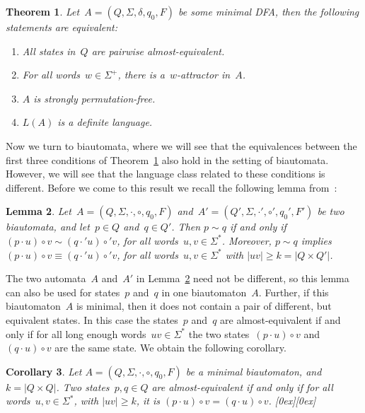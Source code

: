 \documentclass[submission]{eptcs}
\newcommand{\dfa}{\textrm{DFA}}
\newcommand{\abs}[1]{\left\lvert{#1}\right\rvert}
\newcommand*{\qed}{\raisebox{0.5ex}[0ex][0ex]{\framebox[1ex][l]{}}}
\newtheorem{theorem}{Theorem}
\newtheorem{lemma}[theorem]{Lemma}
\newtheorem{corollary}[theorem]{Corollary}
\begin{document}
\begin{theorem}\label{thm:dfa-characterization-almost-definite}
  Let~$A=(Q,\Sigma,\delta,q_0,F)$ be some \emph{minimal} \dfa, then the
  following statements are equivalent:
  \begin{enumerate}
  \item All states in~$Q$ are pairwise
    almost-equivalent.  \label{item:charact-almost}
  \item For all words~$w\in\Sigma^+$, there is a~$w$-attractor
    in~$A$.  \label{item:charact-attractor}
  \item $A$ is strongly
    permutation-free.  \label{item:charact-permutation}
  \item $L(A)$ is a definite language.\label{item:charact-definite}
  \end{enumerate}
\end{theorem}

Now we turn to biautomata, where we will see that the equivalences
between the first three conditions of
Theorem~\ref{thm:dfa-characterization-almost-definite} also hold in
the setting of biautomata.  However, we will see that the language
class related to these conditions is different.
Before we come to this result we recall the following lemma
from~\cite{HoJa14}:

\begin{lemma}\label{lem:dbia-almost-equiv-right-invariant}
  Let~$A=(Q,\Sigma,\cdot,\circ,q_0,F)$
  and~$A'=(Q',\Sigma,\cdot',\circ',q_0',F')$ be two biautomata, and
  let~$p\in Q$ and~$q\in Q'$.  Then $p\sim q$ if and only if $(p\cdot
  u)\circ v\sim (q\cdot' u)\circ' v$, for all words~$u,v\in\Sigma^*$.
  Moreover, $p\sim q$ implies~$(p\cdot u)\circ v \equiv (q\cdot'
  u)\circ' v$, for all words~$u,v\in\Sigma^*$ with $\abs{uv}\geq
  k=\abs{Q\times Q'}$.
\end{lemma}

The two automata~$A$ and~$A'$ in
Lemma~\ref{lem:dbia-almost-equiv-right-invariant} need not be
different, so this lemma can also be used for states~$p$ and~$q$ in
one biautomaton~$A$.  Further, if this biautomaton~$A$ is minimal,
then it does not contain a pair of different, but equivalent states.
In this case the states~$p$ and~$q$ are almost-equivalent if and only
if for all long enough words~$uv\in\Sigma^*$ the two states~$(p\cdot
u)\circ v$ and~$(q\cdot u)\circ v$ are the same state.  We obtain the
following corollary.

\begin{corollary}\label{cor:p-q-almost-iff-equal-for-long-words}
  Let $A=(Q,\Sigma,\cdot,\circ,q_0,F)$ be a \emph{minimal} biautomaton,
  and~$k=\abs{Q\times Q}$.  Two states~$p,q\in Q$ are
  almost-equivalent if and only if for all words~$u,v\in\Sigma^*$,
  with $\abs{uv}\geq k$, it is $(p\cdot u)\circ v = (q\cdot u)\circ
  v$. \hfill \qed
\end{corollary}
\end{document}
